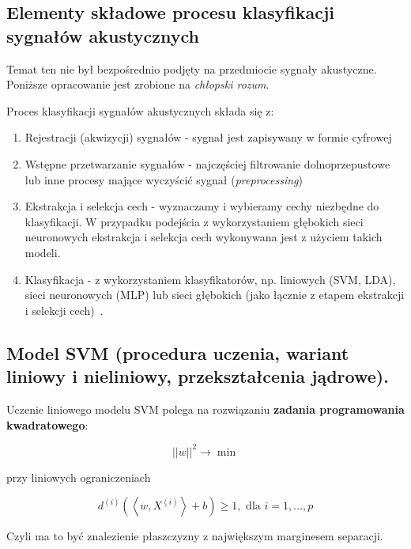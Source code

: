 \documentclass[wi]{zut}
\begin{document}
\subsection{Elementy składowe procesu klasyfikacji sygnałów akustycznych}

Temat ten nie był bezpośrednio podjęty na przedmiocie sygnały akustyczne. Poniższe opracowanie jest zrobione na \textit{chłopski rozum}.
\question

Proces klasyfikacji sygnałów akustycznych składa się z:

\begin{enumerate}
    \item Rejestracji (akwizycji) sygnałów - sygnał jest zapisywany w formie cyfrowej
    \item Wstępne przetwarzanie sygnałów - najczęściej filtrowanie dolnoprzepustowe lub inne procesy mające wyczyścić sygnał (\textit{preprocessing})
    \item Ekstrakcja i selekcja cech - wyznaczamy i wybieramy cechy niezbędne do klasyfikacji. W przypadku podejścia z wykorzystaniem głębokich sieci neuronowych ekstrakcja i selekcja cech wykonywana jest z użyciem takich modeli.
    \item Klasyfikacja - z wykorzystaniem klasyfikatorów, np. liniowych (SVM, LDA), sieci neuronowych (MLP) lub sieci głębokich (jako łącznie z etapem ekstrakcji i selekcji cech)~\cite{jagodzinska2019klasyfikacja}.
\end{enumerate}

\subsection{Model SVM (procedura uczenia, wariant liniowy i nieliniowy, przekształcenia jądrowe).}

Uczenie liniowego modelu SVM polega na rozwiązaniu \textbf{zadania programowania kwadratowego}:

\begin{equation}
    ||w||^2 \rightarrow \min
\end{equation}

przy liniowych ograniczeniach

\begin{equation}
    d^{(i)}\left(\left\langle w, X^{(i)}\right\rangle+b\right) \geqslant 1, \text { dla } i=1, \ldots, p
\end{equation}

Czyli ma to być znalezienie płaszczyzny z największym marginesem separacji.
\end{document}
